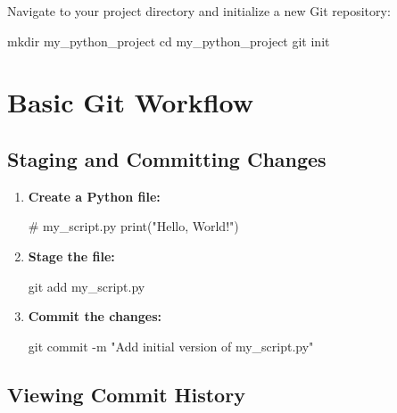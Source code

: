 \documentclass[
  letterpaper,
  DIV=11,
  numbers=noendperiod]{scrreprt}
\newenvironment{Shaded}{\begin{snugshade}}{\end{snugshade}}
\newcommand{\AttributeTok}[1]{\textcolor[rgb]{0.40,0.45,0.13}{#1}}
\newcommand{\BuiltInTok}[1]{\textcolor[rgb]{0.00,0.23,0.31}{#1}}
\newcommand{\CommentTok}[1]{\textcolor[rgb]{0.37,0.37,0.37}{#1}}
\newcommand{\FunctionTok}[1]{\textcolor[rgb]{0.28,0.35,0.67}{#1}}
\newcommand{\NormalTok}[1]{\textcolor[rgb]{0.00,0.23,0.31}{#1}}
\newcommand{\StringTok}[1]{\textcolor[rgb]{0.13,0.47,0.30}{#1}}
\begin{document}
Navigate to your project directory and initialize a new Git repository:

\begin{Shaded}
\begin{Highlighting}[]
\FunctionTok{mkdir}\NormalTok{ my\_python\_project}
\BuiltInTok{cd}\NormalTok{ my\_python\_project}
\FunctionTok{git}\NormalTok{ init}
\end{Highlighting}
\end{Shaded}

\section{Basic Git Workflow}\label{basic-git-workflow}

\subsection{Staging and Committing
Changes}\label{staging-and-committing-changes}

\begin{enumerate}
\def\labelenumi{\arabic{enumi}.}
\item
  \textbf{Create a Python file:}

\begin{Shaded}
\begin{Highlighting}[]
\CommentTok{\# my\_script.py}
\BuiltInTok{print}\NormalTok{(}\StringTok{"Hello, World!"}\NormalTok{)}
\end{Highlighting}
\end{Shaded}
\item
  \textbf{Stage the file:}

\begin{Shaded}
\begin{Highlighting}[]
\FunctionTok{git}\NormalTok{ add my\_script.py}
\end{Highlighting}
\end{Shaded}
\item
  \textbf{Commit the changes:}

\begin{Shaded}
\begin{Highlighting}[]
\FunctionTok{git}\NormalTok{ commit }\AttributeTok{{-}m} \StringTok{"Add initial version of my\_script.py"}
\end{Highlighting}
\end{Shaded}
\end{enumerate}

\subsection{Viewing Commit History}\label{viewing-commit-history-1}
\end{document}
